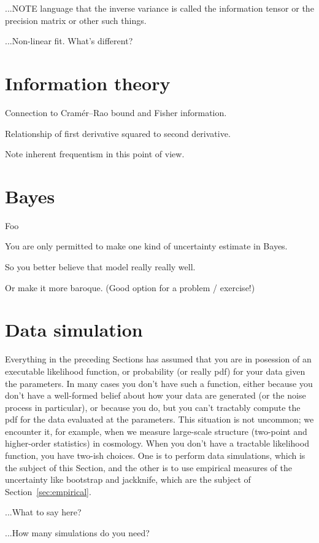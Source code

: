 \documentclass[10pt]{article}
\newcommand{\sectionname}{Section}
\begin{document}
...NOTE language that the inverse variance is called the information tensor or the precision matrix or other such things.

...Non-linear fit. What's different?

\section{Information theory}

Connection to Cram\'er--Rao bound and Fisher information.

Relationship of first derivative squared to second derivative.

Note inherent frequentism in this point of view.

\section{Bayes}

Foo

You are only permitted to make one kind of uncertainty estimate in Bayes.

So you better believe that model really really well.

Or make it more baroque. (Good option for a problem / exercise!)

\section{Data simulation}

Everything in the preceding \sectionname s has assumed that you are in posession
of an executable likelihood function, or probability (or really pdf)
for your data given the parameters.
In many cases you don't have such a function, either because you don't have
a well-formed belief about how your data are generated (or the noise process
in particular), or because you do, but you can't tractably compute the
pdf for the data evaluated at the parameters.
This situation is not uncommon; we encounter it, for example,
when we measure large-scale structure (two-point and higher-order statistics)
in cosmology.
When you don't have a tractable likelihood function, you have two-ish choices.
One is to perform data simulations, which is the subject of this \sectionname,
and the other is to use empirical measures of the uncertainty like bootstrap and
jackknife, which are the subject of \sectionname~\ref{sec:empirical}.

...What to say here?

...How many simulations do you need?
\end{document}
